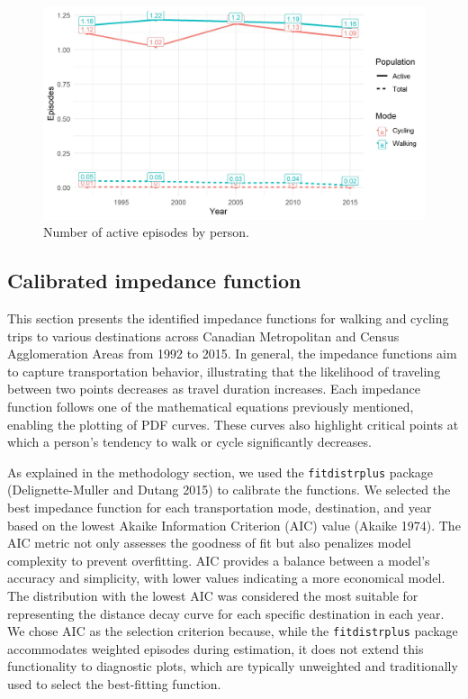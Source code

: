 \documentclass[preprint, 3p,
authoryear]{elsarticle} %
\begin{document}
\begin{figure}

{\centering \includegraphics[width=1\linewidth]{figures/episodes_per_person} 

}

\caption{Number of active episodes by person.}\label{fig:eps-per-person-fig}
\end{figure}

\subsection{Calibrated impedance
function}\label{calibrated-impedance-function}

This section presents the identified impedance functions for walking and
cycling trips to various destinations across Canadian Metropolitan and
Census Agglomeration Areas from 1992 to 2015. In general, the impedance
functions aim to capture transportation behavior, illustrating that the
likelihood of traveling between two points decreases as travel duration
increases. Each impedance function follows one of the mathematical
equations previously mentioned, enabling the plotting of PDF curves.
These curves also highlight critical points at which a person's tendency
to walk or cycle significantly decreases.

As explained in the methodology section, we used the
\texttt{fitdistrplus} package (Delignette-Muller and Dutang 2015) to
calibrate the functions. We selected the best impedance function for
each transportation mode, destination, and year based on the lowest
Akaike Information Criterion (AIC) value (Akaike 1974). The AIC metric
not only assesses the goodness of fit but also penalizes model
complexity to prevent overfitting. AIC provides a balance between a
model's accuracy and simplicity, with lower values indicating a more
economical model. The distribution with the lowest AIC was considered
the most suitable for representing the distance decay curve for each
specific destination in each year. We chose AIC as the selection
criterion because, while the \texttt{fitdistrplus} package accommodates
weighted episodes during estimation, it does not extend this
functionality to diagnostic plots, which are typically unweighted and
traditionally used to select the best-fitting function.
\end{document}

